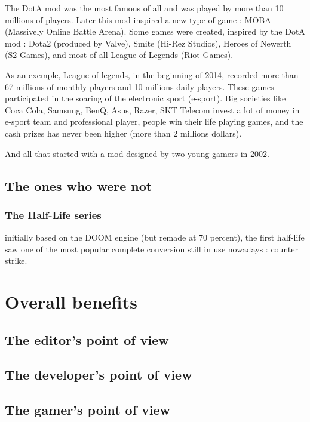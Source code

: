 \documentclass[a4paper,11pt]{article}
\begin{document}
The DotA mod was the most famous of all and was played by more than 10 millions of players. Later this mod inspired a new type of game : MOBA (Massively Online Battle Arena). Some games were created, inspired by the DotA mod : Dota2 (produced by Valve), Smite (Hi-Rez Studios), Heroes of Newerth (S2 Games), and most of all League of Legends (Riot Games). 

As an exemple,  League of legends, in the beginning of 2014, recorded more than 67 millions of monthly players and 10 millions daily players. These games participated in the soaring of the electronic sport (e-sport). Big societies like Coca Cola, Samsung, BenQ, Asus, Razer, SKT Telecom invest a lot of money in e-sport team and professional player, people win their life playing games, and the cash prizes has never been higher (more than 2 millions dollars).

And all that started with a mod designed by two young gamers in 2002.

\subsection{The ones who were not}

\subsubsection{The Half-Life series}

initially based on the DOOM engine (but remade at 70 percent), the first half-life saw one of the most popular complete conversion still in use nowadays : counter strike.



\section{Overall benefits}

\subsection{The editor's point of view}

\subsection{The developer's point of view}

\subsection{The gamer's point of view}
\end{document}
